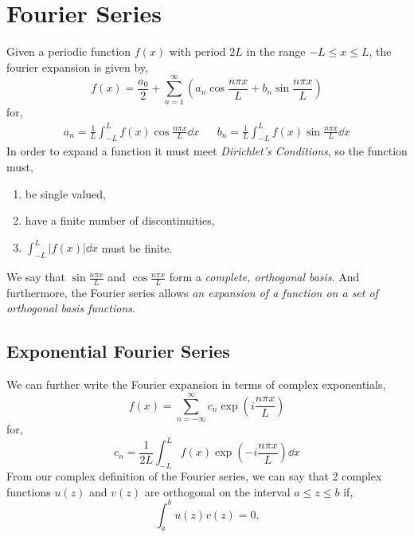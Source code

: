 \documentclass{book}
\begin{document}
\chapter{Fourier Series}
Given a periodic function $f(x)$ with period $2L$ in the range $-L \leq x \leq L$, the fourier expansion is given by,
\begin{equation}
	\boxed{
	f(x) = \frac{a_0}{2} + \sum_{n=1}^{\infty}\left(a_n \cos \frac{n\pi x}{L} + b_n \sin\frac{n\pi x}{L}\right)
	}
\end{equation}
for,
\begin{align}
	\boxed{a_n = \frac{1}{L}\int_{-L}^{L}f(x)\cos\frac{n\pi x}{L}\dd{x}} && \boxed{b_n = \frac{1}{L}\int_{-L}^{L} f(x)\sin\frac{n\pi x}{L} \dd{x}}
\end{align}
In order to expand a function it must meet \textit{Dirichlet's Conditions}, so the function must,
\begin{enumerate}
	\item be single valued,
	\item have a finite number of discontinuities,
	\item $\int_{-L}^L|f(x)|\dd{x}$ must be finite.
\end{enumerate}
We say that $\sin \frac{n\pi x}{L}$ and $\cos\frac{n \pi x}{L}$ form a \textit{complete, orthogonal basis}. And furthermore, the Fourier series allows \textit{an expansion of a function on a set of orthogonal basis functions}.
\section{Exponential Fourier Series}
We can further write the Fourier expansion in terms of complex exponentials,
\begin{equation}
	\boxed{f(x) = \sum_{n = -\infty}^{\infty} c_n \exp\left(i \frac{n\pi x}{L}\right)}
\end{equation}
for,
\begin{equation}
	\boxed{c_n = \frac{1}{2L}\int_{-L}^{L}f(x)\exp\left(-i\frac{n\pi x}{L}\right)\dd{x}}
\end{equation}
From our complex definition of the Fourier series, we can say that 2 complex functions $u(z)$ and $v(z)$ are orthogonal on the interval $a \leq z \leq b$ if,
\begin{equation}
	\int_a^b u(z)v(z) = 0.
\end{equation}
\end{document}
